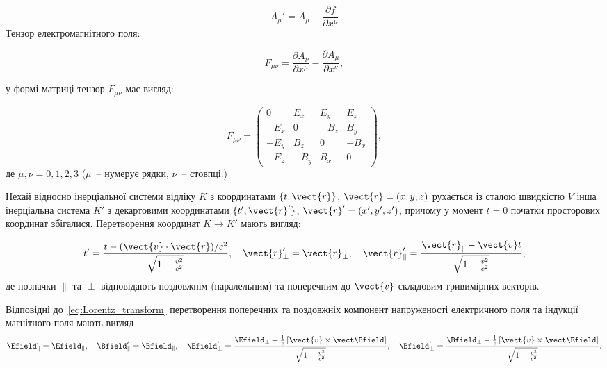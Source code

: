 \begin{Theory}
	\begin{equation}
		A_\mu' = A_\mu - \frac{\partial f}{\partial x^\mu}
	\end{equation}
	Тензор електромагнітного поля:

	\begin{equation}\label{rel_tensor_elmagfield}
		F_{\mu\nu} = \frac{\partial A_\nu}{\partial  x^\mu} - \frac{\partial A_\mu}{\partial  x^\nu},
	\end{equation}

	\noindent у формі матриці тензор $F_{\mu\nu}$ має вигляд:

	\begin{equation}
		F_{\mu\nu} = \left(
		\begin{array}{cccc}
				0    & E_x  & E_y  & E_z  \\
				-E_x & 0    & -B_z & B_y  \\
				-E_y & B_z  & 0    & -B_x \\
				-E_z & -B_y & B_x  & 0
			\end{array}
		\right),
	\end{equation}
	де $\mu,\nu = 0,1,2,3$ ($\mu$~-- нумерує рядки, $\nu$~-- стовпці.)

	Нехай відносно інерціальної системи відліку $K$  з координатами $\{ t, \vect{r} \}$, $\vect{r} = (x,y,z)$ рухається із сталою швидкістю $V$ інша інерціальна система $K'$ з декартовими координатами  $\{ t', \vect{r}' \}$, $\vect{r}' = (x',y',z')$, причому у момент $t = 0$  початки просторових координат збігалися. Перетворення координат $K \to K'$  мають вигляд:


	\begin{equation}\label{eq:Lorentz_transform}
		t' = \frac{t - (\vect{v}\cdot\vect{r})/c^2}{\sqrt{1 - \frac{v^2}{c^2}}}, \quad \vect{r}'_{\perp} = \vect{r}_{\perp}, \quad
		\vect{r}'_{\parallel} = \frac{\vect{r}_{\parallel} - \vect{v}t} {\sqrt{1 - \frac{v^2}{c^2}}},
	\end{equation}
	де позначки $\parallel$  та $\perp$ відповідають поздовжнім (паралельним) та поперечним до $\vect{v}$ складовим тривимірних векторів.

	Відповідні до~\eqref{eq:Lorentz_transform} перетворення поперечних та поздовжніх компонент напруженості електричного поля та індукції магнітного поля мають вигляд
	\begin{equation}\label{eq:Lorentz_transform_F}
		\Efield'_{\parallel}=\Efield_{\parallel}, \quad \Bfield'_{\parallel}=\Bfield_{\parallel}, \quad
		\Efield'_{\perp}= \frac{\Efield_{\perp} + \frac1c\left[ \vect{v}\times\vect\Bfield \right] }{\sqrt{1 - \frac{v^2}{c^2}}}, \quad
		\Bfield'_{\perp}= \frac{\Bfield_{\perp} - \frac1c\left[ \vect{v}\times\vect\Efield \right] }{\sqrt{1 - \frac{v^2}{c^2}}}.
	\end{equation}


\end{Theory}
